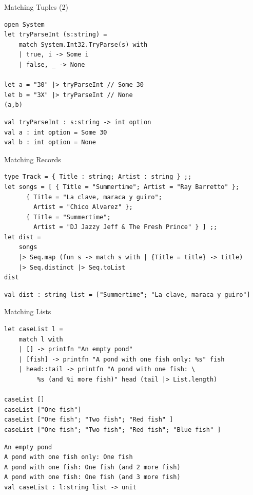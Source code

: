 \documentclass[t]{beamer}
\begin{document}
\begin{frame}[label={sec:orgc1e96da},fragile]{Matching Tuples (2)}
 \begin{verbatim}
open System
let tryParseInt (s:string) =
    match System.Int32.TryParse(s) with 
    | true, i -> Some i
    | false, _ -> None

let a = "30" |> tryParseInt // Some 30
let b = "3X" |> tryParseInt // None
(a,b)
\end{verbatim}

\begin{verbatim}
val tryParseInt : s:string -> int option
val a : int option = Some 30
val b : int option = None
\end{verbatim}
\end{frame}

\begin{frame}[label={sec:org8792f8d},fragile]{Matching Records}
 \begin{verbatim}
type Track = { Title : string; Artist : string } ;;
let songs = [ { Title = "Summertime"; Artist = "Ray Barretto" };
      { Title = "La clave, maraca y guiro";
        Artist = "Chico Alvarez" };
      { Title = "Summertime";
        Artist = "DJ Jazzy Jeff & The Fresh Prince" } ] ;;
let dist = 
    songs 
    |> Seq.map (fun s -> match s with | {Title = title} -> title) 
    |> Seq.distinct |> Seq.toList
dist
\end{verbatim}

\begin{verbatim}
val dist : string list = ["Summertime"; "La clave, maraca y guiro"]
\end{verbatim}
\end{frame}

\begin{frame}[label={sec:org58c4ed1},fragile]{Matching Lists}
 \begin{verbatim}
let caseList l = 
    match l with
    | [] -> printfn "An empty pond" 
    | [fish] -> printfn "A pond with one fish only: %s" fish 
    | head::tail -> printfn "A pond with one fish: \
         %s (and %i more fish)" head (tail |> List.length)

caseList []
caseList ["One fish"]
caseList ["One fish"; "Two fish"; "Red fish" ]
caseList ["One fish"; "Two fish"; "Red fish"; "Blue fish" ]
\end{verbatim}

\begin{verbatim}
An empty pond
A pond with one fish only: One fish
A pond with one fish: One fish (and 2 more fish)
A pond with one fish: One fish (and 3 more fish)
val caseList : l:string list -> unit
\end{verbatim}
\end{frame}
\end{document}
